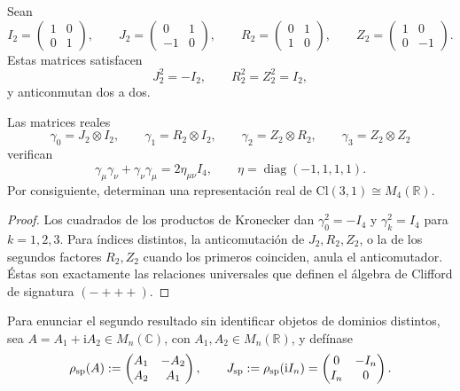 Sean
\[
 I_2=\begin{pmatrix}1&0\\0&1\end{pmatrix},
 \qquad
 J_2=\begin{pmatrix}0&1\\-1&0\end{pmatrix},
 \qquad
 R_2=\begin{pmatrix}0&1\\1&0\end{pmatrix},
 \qquad
 Z_2=\begin{pmatrix}1&0\\0&-1\end{pmatrix}.
\]
Estas matrices satisfacen
\[
 J_2^2=-I_2,\qquad R_2^2=Z_2^2=I_2,
\]
y anticonmutan dos a dos.

\begin{theorem}
\label{thm:clifford-real-31}
Las matrices reales
\[
 \gamma_0=J_2\otimes I_2,\qquad
 \gamma_1=R_2\otimes I_2,\qquad
 \gamma_2=Z_2\otimes R_2,\qquad
 \gamma_3=Z_2\otimes Z_2
\]
verifican
\[
 \gamma_\mu\gamma_\nu+\gamma_\nu\gamma_\mu
 =2\eta_{\mu\nu}I_4,
 \qquad
 \eta=\operatorname{diag}(-1,1,1,1).
\]
Por consiguiente, determinan una representación real de
\(\mathrm{Cl}(3,1)\cong M_4(\mathbb R)\).
\end{theorem}

\begin{proof}
Los cuadrados de los productos de Kronecker dan
\(\gamma_0^2=-I_4\) y \(\gamma_k^2=I_4\) para \(k=1,2,3\).
Para índices distintos, la anticomutación de \(J_2,R_2,Z_2\), o la de
los segundos factores \(R_2,Z_2\) cuando los primeros coinciden, anula el
anticomutador. Éstas son exactamente las relaciones universales que definen
el álgebra de Clifford de signatura \((-+++)\).
\end{proof}

Para enunciar el segundo resultado sin identificar objetos de dominios
distintos, sea \(A=A_1+\mathrm iA_2\in M_n(\mathbb C)\), con
\(A_1,A_2\in M_n(\mathbb R)\), y defínase
\[
 \rho_{\rm sp}(A):=
 \begin{pmatrix}
  A_1&-A_2\\
  A_2&A_1
 \end{pmatrix},
 \qquad
 J_{\rm sp}:=\rho_{\rm sp}(\mathrm iI_n)
 =\begin{pmatrix}
  0&-I_n\\
  I_n&0
 \end{pmatrix}.
\]

